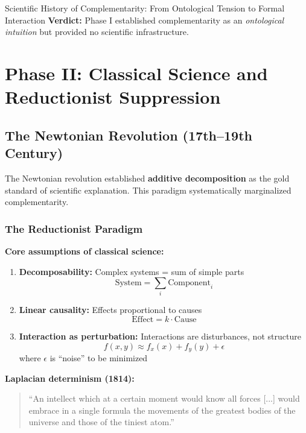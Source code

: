 \begin{chapter}{Scientific History of Complementarity: From Ontological Tension to Formal Interaction}
\textbf{Verdict:} Phase I established complementarity as an \textit{ontological intuition} but provided no scientific infrastructure.

\section{Phase II: Classical Science and Reductionist Suppression}
\label{sec:phase-ii}

\subsection{The Newtonian Revolution (17th--19th Century)}

\begin{tcolorbox}[colback=orange!5!white,colframe=orange!75!black,title=\textbf{Critical Historical Event}]
The Newtonian revolution established \textbf{additive decomposition} as the gold standard of scientific explanation. This paradigm systematically marginalized complementarity.
\end{tcolorbox}

\subsubsection{The Reductionist Paradigm}

\textbf{Core assumptions of classical science:}

\begin{enumerate}
    \item \textbf{Decomposability:} Complex systems = sum of simple parts
    \[
    \text{System} = \sum_{i} \text{Component}_i
    \]

    \item \textbf{Linear causality:} Effects proportional to causes
    \[
    \text{Effect} = k \cdot \text{Cause}
    \]

    \item \textbf{Interaction as perturbation:} Interactions are disturbances, not structure
    \[
    f(x,y) \approx f_x(x) + f_y(y) + \epsilon
    \]
    where $\epsilon$ is ``noise'' to be minimized
\end{enumerate}

\textbf{Laplacian determinism (1814):}
\begin{quote}
``An intellect which at a certain moment would know all forces [...] would embrace in a single formula the movements of the greatest bodies of the universe and those of the tiniest atom.''
\end{quote}


\end{chapter}
